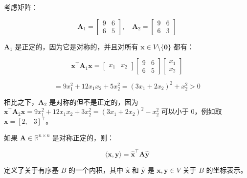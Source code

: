 \begin{notebox}
考虑矩阵：

\begin{equation}
\boldsymbol{A}_1 = \begin{bmatrix} 9 & 6 \\ 6 & 5 \end{bmatrix}, \quad \boldsymbol{A}_2 = \begin{bmatrix} 9 & 6 \\ 6 & 3 \end{bmatrix}
\tag{3.12}\label{eq:3-12}
\end{equation}

$ \boldsymbol{A}_1 $ 是正定的，因为它是对称的，并且对所有 $ \boldsymbol{x} \in V \setminus \{\boldsymbol{0}\} $ 都有：

\begin{equation}
\boldsymbol{x}^\top \boldsymbol{A}_1 \boldsymbol{x} = \begin{bmatrix} x_1 & x_2 \end{bmatrix} \begin{bmatrix} 9 & 6 \\ 6 & 5 \end{bmatrix} \begin{bmatrix} x_1 \\ x_2 \end{bmatrix}
\tag{3.13a}\label{eq:3-13a}
\end{equation}

\begin{equation}
= 9 x_1^2 + 12 x_1 x_2 + 5 x_2^2 = (3 x_1 + 2 x_2)^2 + x_2^2 > 0
\tag{3.13b}\label{eq:3-13b}
\end{equation}

相比之下，$ \boldsymbol{A}_2 $ 是对称的但不是正定的，因为 $ \boldsymbol{x}^\top \boldsymbol{A}_2 \boldsymbol{x} = 9 x_1^2 + 12 x_1 x_2 + 3 x_2^2 = (3 x_1 + 2 x_2)^2 - x_2^2 $ 可以小于 0，例如取 $ \boldsymbol{x} = [2, -3]^\top $。
\end{notebox}

如果 $ \boldsymbol{A} \in \mathbb{R}^{n \times n} $ 是对称正定的，则：

\begin{equation}
\langle \boldsymbol{x}, \boldsymbol{y} \rangle = \hat{\boldsymbol{x}}^\top \boldsymbol{A} \hat{\boldsymbol{y}}
\tag{3.14}\label{eq:3-14}
\end{equation}

定义了关于有序基 $ B $ 的一个内积，其中 $ \hat{\boldsymbol{x}} $ 和 $ \hat{\boldsymbol{y}} $ 是 $ \boldsymbol{x}, \boldsymbol{y} \in V $ 关于 $ B $ 的坐标表示。

